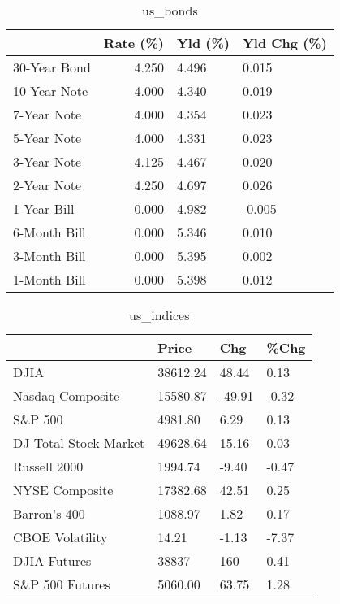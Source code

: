 \documentclass{article}%
\begin{document}
%


\begin{table}[htbp]%
\caption{us\_bonds}%
\centering%
\begin{adjustbox}{width=1\textwidth}%
\begin{tabular}{lrll}
\toprule
             &  Rate (\%) & Yld (\%) & Yld Chg (\%) \\
\midrule
30-Year Bond &     4.250 &   4.496 &       0.015 \\
10-Year Note &     4.000 &   4.340 &       0.019 \\
 7-Year Note &     4.000 &   4.354 &       0.023 \\
 5-Year Note &     4.000 &   4.331 &       0.023 \\
 3-Year Note &     4.125 &   4.467 &       0.020 \\
 2-Year Note &     4.250 &   4.697 &       0.026 \\
 1-Year Bill &     0.000 &   4.982 &      -0.005 \\
6-Month Bill &     0.000 &   5.346 &       0.010 \\
3-Month Bill &     0.000 &   5.395 &       0.002 \\
1-Month Bill &     0.000 &   5.398 &       0.012 \\
\bottomrule
\end{tabular}
%
\end{adjustbox}%
\end{table}

%


\begin{table}[htbp]%
\caption{us\_indices}%
\centering%
\begin{adjustbox}{width=1\textwidth}%
\begin{tabular}{llll}
\toprule
                      &    Price &    Chg &  \%Chg \\
\midrule
                 DJIA & 38612.24 &  48.44 &  0.13 \\
     Nasdaq Composite & 15580.87 & -49.91 & -0.32 \\
              S\&P 500 &  4981.80 &   6.29 &  0.13 \\
DJ Total Stock Market & 49628.64 &  15.16 &  0.03 \\
         Russell 2000 &  1994.74 &  -9.40 & -0.47 \\
       NYSE Composite & 17382.68 &  42.51 &  0.25 \\
         Barron's 400 &  1088.97 &   1.82 &  0.17 \\
      CBOE Volatility &    14.21 &  -1.13 & -7.37 \\
         DJIA Futures &    38837 &    160 &  0.41 \\
      S\&P 500 Futures &  5060.00 &  63.75 &  1.28 \\
\bottomrule
\end{tabular}
%
\end{adjustbox}%
\end{table}
\end{document}
